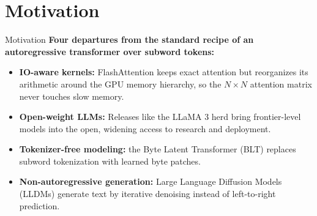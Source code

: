 \section{Motivation}
\begin{frame}[allowframebreaks]{Motivation}
\noindent
\textbf{Four departures from the standard recipe of an autoregressive transformer over subword tokens:}
\vspace{0.5em}

\begin{itemize}
    \item \textbf{IO-aware kernels:} FlashAttention keeps exact attention but reorganizes its arithmetic around the GPU memory hierarchy, so the $N \times N$ attention matrix never touches slow memory.
    \item \textbf{Open-weight LLMs:} Releases like the LLaMA 3 herd bring frontier-level models into the open, widening access to research and deployment.
    \item \textbf{Tokenizer-free modeling:} the Byte Latent Transformer (BLT) replaces subword tokenization with learned byte patches.
    \item \textbf{Non-autoregressive generation:} Large Language Diffusion Models (LLDMs) generate text by iterative denoising instead of left-to-right prediction.
\end{itemize}
\end{frame}
